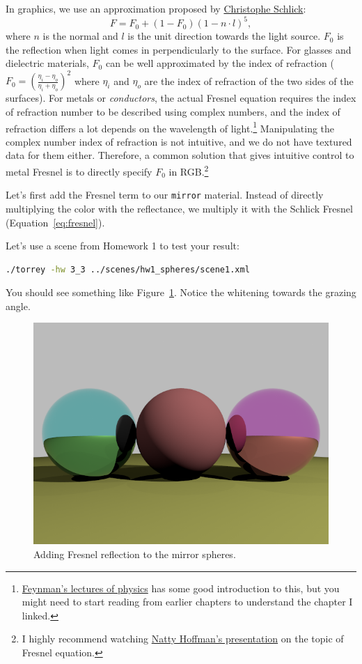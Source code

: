 In graphics, we use an approximation proposed by \href{https://en.wikipedia.org/wiki/Schlick%27s_approximation}{Christophe Schlick}:
\begin{equation}
F = F_0 + (1 - F_0) \left(1 - n \cdot l\right)^5,
\label{eq:fresnel}
\end{equation}
where $n$ is the normal and $l$ is the unit direction towards the light source. $F_0$ is the reflection when light comes in perpendicularly to the surface. For glasses and dielectric materials, $F_0$ can be well approximated by the index of refraction ($F_0 = \left(\frac{\eta_i - \eta_o}{\eta_i + \eta_o}\right)^2$ where $\eta_i$ and $\eta_o$ are the index of refraction of the two sides of the surfaces). For metals or \emph{conductors}, the actual Fresnel equation requires the index of refraction number to be described using complex numbers, and the index of refraction differs a lot depends on the wavelength of light.\footnote{\href{https://www.feynmanlectures.caltech.edu/I_31.html}{Feynman's lectures of physics} has some good introduction to this, but you might need to start reading from earlier chapters to understand the chapter I linked.} Manipulating the complex number index of refraction is not intuitive, and we do not have textured data for them either. Therefore, a common solution that gives intuitive control to metal Fresnel is to directly specify $F_0$ in RGB.\footnote{I highly recommend watching \href{https://www.youtube.com/watch?v=kEcDbl7eS0w}{Natty Hoffman's presentation} on the topic of Fresnel equation.}

Let's first add the Fresnel term to our \lstinline{mirror} material. Instead of directly multiplying the color with the reflectance, we multiply it with the Schlick Fresnel (Equation~\eqref{eq:fresnel}). 

Let's use a scene from Homework 1 to test your result:
\begin{lstlisting}[language=bash]
./torrey -hw 3_3 ../scenes/hw1_spheres/scene1.xml
\end{lstlisting}

You should see something like Figure~\ref{fig:hw_3_3_fresnel}. Notice the whitening towards the grazing angle.

\begin{figure}[ht]
    \centering
    \includegraphics[width=0.4\linewidth]{imgs/hw_3_3a.png}
    \caption{Adding Fresnel reflection to the mirror spheres.}
    \label{fig:hw_3_3_fresnel}
\end{figure}

